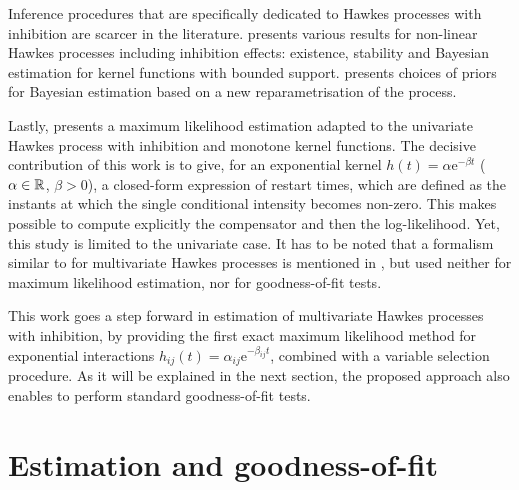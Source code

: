     Inference procedures that are specifically dedicated to Hawkes processes with inhibition are scarcer in the literature. \textcite{Sulem2021} presents various results for non-linear Hawkes processes including inhibition effects: existence, stability and Bayesian estimation for kernel functions with bounded support.
    \textcite{Deutsch2022} presents choices of priors for Bayesian estimation based on a new reparametrisation of the process.

    Lastly, \textcite{bonnet2021} presents a maximum likelihood estimation adapted to the univariate Hawkes process with inhibition and monotone kernel functions.
    The decisive contribution of this work is to give, for an exponential kernel \(h(t) = \alpha \mathrm{e}^{-\beta t}\) (\(\alpha \in {\mathbb R}\), \(\beta>0\)), a closed-form expression of restart times, which are defined as the instants at which the single conditional intensity becomes non-zero.
    This makes possible to compute explicitly the compensator and then the log-likelihood.
    Yet, this study is limited to the univariate case.
    It has to be noted that a formalism similar to \textcite{bonnet2021} for multivariate Hawkes processes is mentioned in \textcite{Deutsch2022},
    but used neither for maximum likelihood estimation, nor for goodness-of-fit tests.

    This work goes a step forward in estimation of multivariate Hawkes processes with inhibition, by providing the first exact maximum likelihood method for exponential interactions $h_{ij}(t) = \alpha_{ij}\mathrm{e}^{-\beta_{ij}t}$, combined with a variable selection procedure.
    As it will be explained in the next section, the proposed approach also enables to perform standard goodness-of-fit tests.

    \section{Estimation and goodness-of-fit}\label{sec:chap3_exponential}

